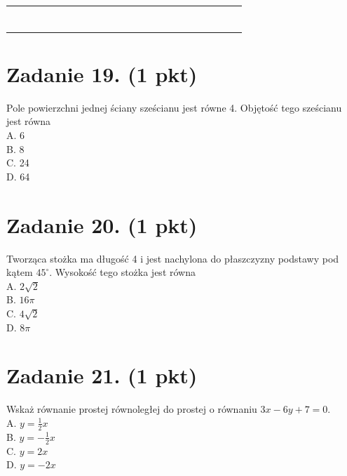 \documentclass[10pt]{article}
\begin{document}
\begin{center}
\begin{tabular}{|c|c|c|c|c|c|c|c|c|c|c|c|c|c|c|c|c|c|c|c|c|c|c|c|}
\hline
 &  &  &  &  &  &  &  &  &  &  &  &  &  &  &  &  &  &  &  &  &  &  &  \\
\hline
 &  &  &  &  &  &  &  &  &  &  &  &  &  &  &  &  &  &  &  &  &  &  &  \\
\hline
 &  &  &  &  &  &  &  &  &  &  &  &  &  &  &  &  &  &  &  &  &  &  &  \\
\hline
 &  &  &  &  &  &  &  &  &  &  &  &  &  &  &  &  &  &  &  &  &  &  &  \\
\hline
 &  &  &  &  &  &  &  &  &  &  &  &  &  &  &  &  &  &  &  &  &  &  &  \\
\hline
 &  &  &  &  &  &  &  &  &  &  &  &  &  &  &  &  &  &  &  &  &  &  &  \\
\hline
 &  &  &  &  &  &  &  &  &  &  &  &  &  &  &  &  &  &  &  &  &  &  &  \\
\hline
 &  &  &  &  &  &  &  &  &  &  &  &  &  &  &  &  &  &  &  &  &  &  &  \\
\hline
\end{tabular}
\end{center}

\section*{Zadanie 19. (1 pkt)}
Pole powierzchni jednej ściany sześcianu jest równe 4. Objętość tego sześcianu jest równa\\
A. 6\\
B. 8\\
C. 24\\
D. 64

\section*{Zadanie 20. (1 pkt)}
Tworząca stożka ma długość 4 i jest nachylona do płaszczyzny podstawy pod kątem \(45^{\circ}\). Wysokość tego stożka jest równa\\
A. \(2 \sqrt{2}\)\\
B. \(16 \pi\)\\
C. \(4 \sqrt{2}\)\\
D. \(8 \pi\)

\section*{Zadanie 21. (1 pkt)}
Wskaż równanie prostej równoległej do prostej o równaniu \(3 x-6 y+7=0\).\\
A. \(y=\frac{1}{2} x\)\\
B. \(y=-\frac{1}{2} x\)\\
C. \(y=2 x\)\\
D. \(y=-2 x\)
\end{document}
